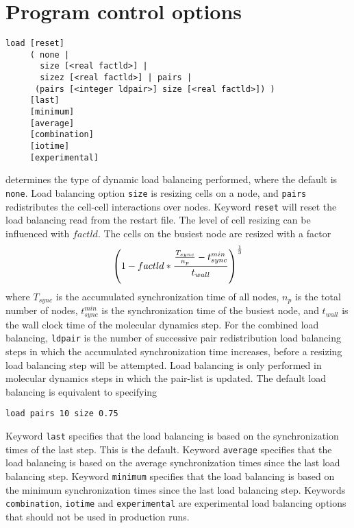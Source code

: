 \section{Program control options}
\begin{description}
\item
\begin{verbatim}
load [reset] 
     ( none | 
       size [<real factld>] |
       sizez [<real factld>] | pairs | 
      (pairs [<integer ldpair>] size [<real factld>]) )
     [last]
     [minimum]
     [average]
     [combination]
     [iotime]
     [experimental]

\end{verbatim}
determines the type of dynamic load balancing performed,
where the default is {\tt none}. Load balancing option {\tt size}
is resizing cells on a node, and {\tt pairs} redistributes the
cell-cell interactions over nodes. Keyword \verb+reset+ will reset the
load balancing read from the restart file. The level of cell resizing
can be influenced with $factld$. The cells on the busiest node are
resized with a factor
\begin{equation}
\left( 1 - factld * { {T_{sync} \over n_p} - t^{min}_{sync} \over t_{wall}}
\right)^{1\over 3}
\end{equation}
where $T_{sync}$ is the accumulated synchronization time of all nodes,
$n_p$ is the total number of nodes, $t^{min}_{sync}$ is the synchronization
time of the busiest node, and $t_{wall}$ is the wall clock time of the
molecular dynamics step.
For the combined load balancing, \verb+ldpair+ is the number of successive pair 
redistribution load balancing steps in which the accumulated synchronization
time increases, before a resizing load balancing step will be attempted.
Load balancing is only performed in molecular dynamics steps in which the
pair-list is updated. The default load balancing is equivalent to specifying\\
\begin{verbatim}
load pairs 10 size 0.75
\end{verbatim}
Keyword \verb+last+ specifies that the load balancing is based on the
synchronization times of the last step. This is the default.
Keyword \verb+average+ specifies that the load balancing is based on the
average synchronization times since the last load balancing step.
Keyword \verb+minimum+ specifies that the load balancing is based on the
minimum synchronization times since the last load balancing step.
Keywords \verb+combination+, \verb+iotime+ and \verb+experimental+ are
experimental load balancing options that should not be used in
production runs.


\end{description}
